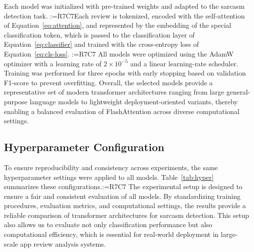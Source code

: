 \documentclass[a4paper,fleqn]{cas-sc}
\makeatletter
\newif\iftracked
\newcommand{\rv@setcolour}[1]{%
  \IfStrEq{#1}{R7C7}{\color{rvEdit}}{%
    \IfSubStr{#1}{R5}{\IfSubStr{#1}{R7}{\color{rvBoth}}{\color{rvFive}}}{\color{rvSeven}}}}
\newcommand{\rv@tag}[1]{\textsuperscript{\sffamily\bfseries\scriptsize[\StrSubstitute{#1}{,}{, }]}\,}
\newcommand{\rv@recordone}[1]{%
  \edef\rv@i{#1}%
  \ifcsdef{rv@n@\rv@i}{}{\csgdef{rv@n@\rv@i}{0}}%
  \csxdef{rv@n@\rv@i}{\the\numexpr\csuse{rv@n@\rv@i}+1\relax}%
  \begingroup\edef\@currentlabel{\rv@i}\label{rv:\rv@i:\csuse{rv@n@\rv@i}}\endgroup}
\newcommand{\rv@record}[1]{\@for\rv@id:=#1\do{\expandafter\rv@recordone\expandafter{\rv@id}}}
\DeclareRobustCommand{\rcrep}[3]{\rv@record{#1}\iftracked{\rv@setcolour{#1}\rv@tag{#1}\rv@strike{#2} #3}\else#3\fi}
\DeclareRobustCommand{\rce}[1]{\rv@record{R7C7}\iftracked{\color{rvEdit}#1}\else#1\fi}
\DeclareRobustCommand{\rcnote}[2]{\rv@record{#1}\iftracked{\rv@setcolour{#1}\rv@tag{#1}\textit{[#2]}}\else\unskip\fi}
\makeatother
\begin{document}
Each model was initialized with pre-trained weights and adapted to the sarcasm detection task. \rcrep{R7C7}{Each input review is first tokenized and represented as a sequence of tokens. These tokens are processed by the transformer encoder, where contextual relationships are computed using self-attention. According to Equation (26), the model captures dependencies between all tokens, enabling it to identify contrastive and ironic patterns in the text. The final contextual representation is obtained from the special classification token. This embedding is passed to the classification layer, where W and b are trainable parameters. The model is trained by minimizing the cross-entropy loss. As defined in Equation (29), this objective encourages the predicted probabilities to align with the true labels.}{Each review is tokenized, encoded with the self-attention of Equation~\eqref{eq:attention}, and represented by the embedding of the special classification token, which is passed to the classification layer of Equation~\eqref{eq:classifier} and trained with the cross-entropy loss of Equation~\eqref{eq:cls-loss}.} \rcnote{R7C7}{Equations (26) to (29) of the previous version repeated Equations (7), (10) and (11) and have been removed} All models were optimized using the AdamW optimizer with a learning rate of $2\times10^{-5}$ and a linear learning-rate scheduler. Training was performed for three epochs with early stopping based on validation F1-score to prevent overfitting. Overall, the selected models provide a representative set of modern transformer architectures ranging from large general-purpose language models to lightweight deployment-oriented variants, thereby enabling a balanced evaluation of FlashAttention across diverse computational settings.

\subsection{Hyperparameter Configuration}
To ensure reproducibility and consistency across experiments, the same hyperparameter settings were applied to all models. Table~\ref{tab:hyper} summarizes these configurations.\rce{ }The experimental setup is designed to ensure a fair and consistent evaluation of all models. By standardizing training procedures, evaluation metrics, and computational settings, the results provide a reliable comparison of transformer architectures for sarcasm detection. This setup also allows us to evaluate not only classification performance but also computational efficiency, which is essential for real-world deployment in large-scale app review analysis systems.
\end{document}
